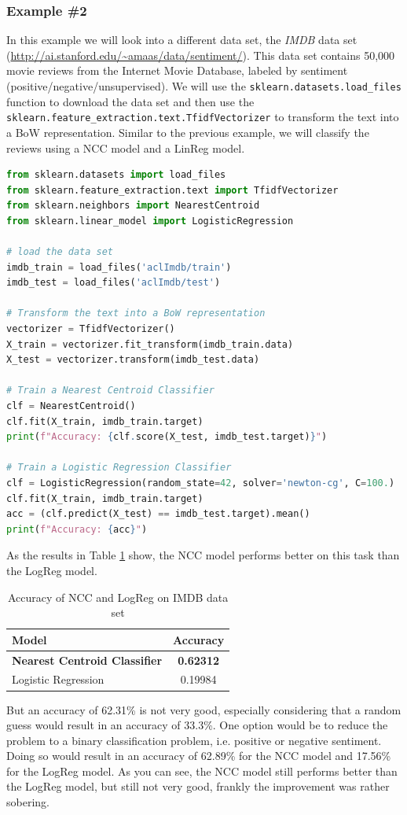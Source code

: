 \subsubsection{Example \#2}
In this example we will look into a different data set, the \textit{IMDB} data set~\cite{maas-EtAl:2011:ACL-HLT2011} (\url{http://ai.stanford.edu/~amaas/data/sentiment/}).
This data set contains 50,000 movie reviews from the Internet Movie Database, labeled by sentiment (positive/negative/unsupervised).
We will use the \lstinline{sklearn.datasets.load_files} function to download the data set and then use the \lstinline{sklearn.feature_extraction.text.TfidfVectorizer}
to transform the text into a BoW representation.
Similar to the previous example, we will classify the reviews using a NCC model and a LinReg model.

\begin{lstlisting}[language=Python, caption={IMDB example}, label={code:imdb}]
from sklearn.datasets import load_files
from sklearn.feature_extraction.text import TfidfVectorizer
from sklearn.neighbors import NearestCentroid
from sklearn.linear_model import LogisticRegression

# load the data set
imdb_train = load_files('aclImdb/train')
imdb_test = load_files('aclImdb/test')

# Transform the text into a BoW representation
vectorizer = TfidfVectorizer()
X_train = vectorizer.fit_transform(imdb_train.data)
X_test = vectorizer.transform(imdb_test.data)

# Train a Nearest Centroid Classifier
clf = NearestCentroid()
clf.fit(X_train, imdb_train.target)
print(f"Accuracy: {clf.score(X_test, imdb_test.target)}")

# Train a Logistic Regression Classifier
clf = LogisticRegression(random_state=42, solver='newton-cg', C=100.)
clf.fit(X_train, imdb_train.target)
acc = (clf.predict(X_test) == imdb_test.target).mean()
print(f"Accuracy: {acc}")
\end{lstlisting}
As the results in Table \ref{tab:imdb} show, the NCC model performs better on this task than the LogReg model.
\begin{table}[h]
  \centering
  \begin{tabular}{|l|c|}
    \hline
    \textbf{Model} & \textbf{Accuracy} \\
    \hline
    \textbf{Nearest Centroid Classifier} & \textbf{0.62312}\\
    Logistic Regression & 0.19984\\
    \hline
  \end{tabular}
  \caption{Accuracy of NCC and LogReg on IMDB data set}
  \label{tab:imdb}
\end{table}
But an accuracy of 62.31\% is not very good, especially considering that a random guess would result in an accuracy of 33.3\%.
One option would be to reduce the problem to a binary classification problem, i.e. positive or negative sentiment.
Doing so would result in an accuracy of 62.89\% for the NCC model and 17.56\% for the LogReg model.
As you can see, the NCC model still performs better than the LogReg model, but still not very good, frankly the improvement was rather sobering.

